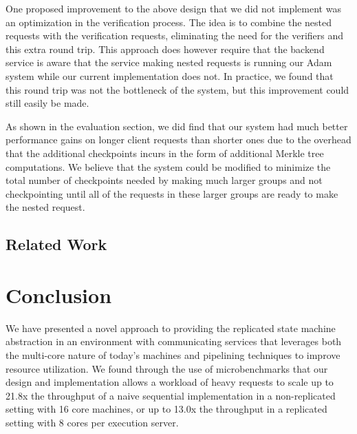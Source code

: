 \documentclass[11pt, oneside]{report}
\begin{document}
One proposed improvement to the above design that we did not implement was an optimization in the verification process. The idea is to combine the nested requests with the verification requests, eliminating the need for the verifiers and this extra round trip. This approach does however require that the backend service is aware that the service making nested requests is running our Adam system while our current implementation does not. In practice, we found that this round trip was not the bottleneck of the system, but this improvement could still easily be made.

As shown in the evaluation section, we did find that our system had much better performance gains on longer client requests than shorter ones due to the overhead that the additional checkpoints incurs in the form of additional Merkle tree computations. We believe that the system could be modified to minimize the total number of checkpoints needed by making much larger groups and not checkpointing until all of the requests in these larger groups are ready to make the nested request.

\section{Related Work}

\chapter{Conclusion}

We have presented a novel approach to providing the replicated state machine abstraction in an environment with communicating services that leverages both the multi-core nature of today's machines and pipelining techniques to improve resource utilization. We found through the use of microbenchmarks that our design and implementation allows a workload of heavy requests to scale up to 21.8x the throughput of a naive sequential implementation in a non-replicated setting with 16 core machines, or up to 13.0x the throughput in a replicated setting with 8 cores per execution server.
\end{document}

